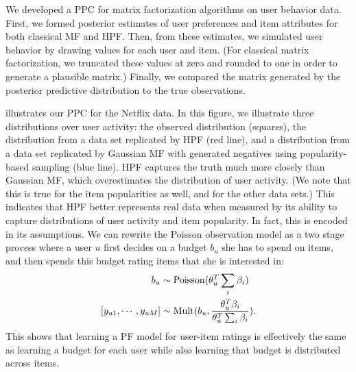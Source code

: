 We developed a PPC for matrix factorization algorithms on user
behavior data.  First, we formed posterior estimates of user
preferences and item attributes for both classical MF and HPF.  Then,
from these estimates, we simulated user behavior by
drawing values for each user and item.  (For classical matrix
factorization, we truncated these values at zero and rounded to one in
order to generate a plausible matrix.)  Finally, we compared
the matrix generated by the posterior predictive distribution to the
true observations.

 illustrates our PPC for the Netflix data.  In this
figure, we illustrate three distributions over user activity: the
observed distribution (squares), the distribution from a data set
replicated by HPF (red line), and a distribution from a data set
replicated by Gaussian MF with generated negatives using
popularity-based sampling (blue line).  HPF captures the truth much
more closely than Gaussian MF, which overestimates the distribution of
user activity. (We note that this is true for the item popularities as
well, and for the other data sets.)  This indicates that HPF better
represents real data when measured by its ability to capture
distributions of user activity and item popularity.  In fact, this is
encoded in its assumptions. We can rewrite the Poisson observation
model as a two stage process where a user $u$ first decides on a
budget $b_u$ she has to spend on items, and then spends this budget
rating items that she is interested in:
\begin{align}
b_u & \sim \textrm{Poisson}(\theta_u^T \sum_i \beta_i)\nonumber\\
[y_{u1},\cdots,y_{uM}] & \sim \textrm{Mult}(b_u, \frac{\theta_u^T \beta_i}{\theta_u^T \sum_i \beta_i}).\nonumber
\end{align}
This shows that learning a PF model for user-item ratings is
effectively the same as learning a budget for each user while also
learning that budget is distributed across items.


